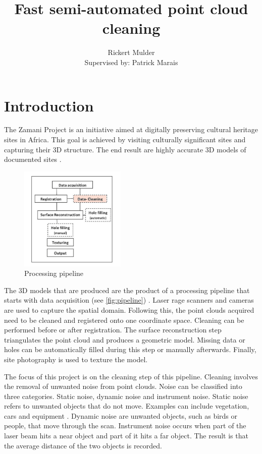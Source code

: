 \documentclass[10pt,twocolumn]{article}
\title{Fast semi-automated point cloud cleaning}
\author{Rickert Mulder\\ Supervised by: Patrick Marais}
\date{}
\begin{document}
\maketitle

\section{Introduction}
The Zamani Project is an initiative aimed at digitally preserving cultural heritage sites in Africa. This goal is achieved by visiting culturally significant sites and capturing their 3D structure. The end result are highly accurate 3D models of documented sites \cite{Ruther2011}.

\begin{figure}[htb]
\centering
\includegraphics[width=0.45\textwidth]{pics/pipeline.png}
\caption{Processing pipeline \cite{Ruther2011}}
\label{fig:pipeline}
\end{figure}


The 3D models that are produced are the product of a processing pipeline that starts with data acquisition (see \autoref{fig:pipeline}) \cite{Ruther2011}. Laser rage scanners and cameras are used to capture the spatial domain. Following this, the point clouds acquired need to be cleaned and registered onto one coordinate space. Cleaning can be performed before or after registration. The surface reconstruction step triangulates the point cloud and produces a geometric model. Missing data or holes can be automatically filled during this step or manually afterwards. Finally, site photography is used to texture the model.

The focus of this project is on the cleaning step of this pipeline. Cleaning involves the removal of unwanted noise from point clouds. Noise can be classified into three categories. Static noise, dynamic noise and instrument noise. Static noise refers to unwanted objects that do not move. Examples can include vegetation, cars and equipment \cite{Held2012}. Dynamic noise are unwanted objects, such as birds or people, that move through the scan. Instrument noise occurs when part of the laser beam hits a near object and part of it hits a far object. The result is that the average distance of the two objects is recorded.
\end{document}
